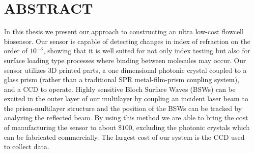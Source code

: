 \section*{ABSTRACT}
\hspace{0.25in}
In this thesis we present our approach to constructing an ultra low-cost flowcell biosensor. Our sensor is capable of detecting changes in index of refraction on the order of $10^{-3}$, showing that it is well suited for not only index testing but also for surface loading type processes where binding between molecules may occur. Our sensor utilizes 3D printed parts, a one dimensional photonic crystal coupled to a glass prism (rather than a traditional SPR metal-film-prism coupling system), and a CCD to operate. Highly sensitive Bloch Surface Waves (BSWs) can be excited in the outer layer of our multilayer by coupling an incident laser beam to the prism-multilayer structure and the position of the BSWs can be tracked by analyzing the reflected beam. By using this method we are able to bring the cost of manufacturing the sensor to about $\$100$, excluding the photonic crystals which can be fabricated commercially. The largest cost of our system is the CCD used to collect data. \\